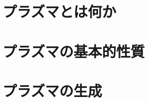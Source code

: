 \documentclass{report}
\begin{document}
  \maketitle
  \tableofcontents
  \setcounter{chapter}{-1}
  \chapter{プラズマとは何か}
    
  \chapter{プラズマの基本的性質}
    
  \chapter{プラズマの生成}
    
\end{document}
